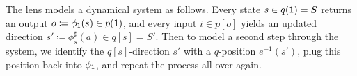 \documentclass[Book-Poly]{subfiles}
\begin{document}
The lens models a dynamical system as follows.
Every state $s\in q(\textsf{1})=S$ returns an output $o\coloneqq\phi_{\textsf{1}}(s)\in p(\textsf{1})$, and every input $i\in p[o]$ yields an updated direction $s'\coloneqq\phi^\sharp_s(a)\in q[s]=S'$.
Then to model a second step through the system, we identify the $q[s]$-direction $s'$ with a $q$-position $e^{-1}(s')$, plug this position back into $\phi_{\textsf{1}}$, and repeat the process all over again.

\end{document}
